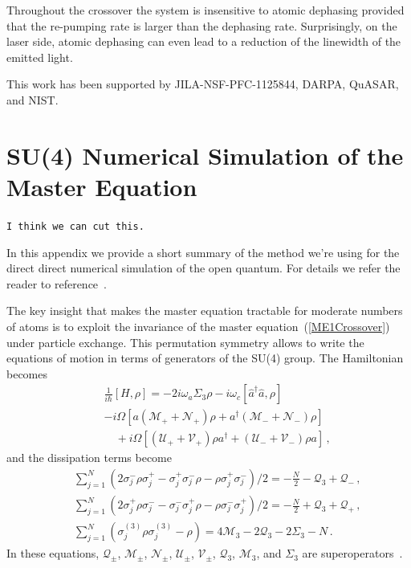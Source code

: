 \documentclass[aps,
twocolumn,
showpacs,
superscriptaddress,groupedaddress]{revtex4}
\newcommand{\dmcomment}[1]{{\tt #1}}
\begin{document}
Throughout the crossover the system is insensitive to atomic dephasing
provided that the re-pumping rate is larger than the dephasing rate.
Surprisingly, on the laser side, atomic dephasing can even lead to a
reduction of the linewidth of the emitted light.

This work has been supported by JILA-NSF-PFC-1125844, DARPA, QuASAR, and
NIST.

\appendix

\section{SU(4) Numerical Simulation of the Master Equation}
\label{Su4Appendix}

\dmcomment{I think we can cut this.}

In this appendix we provide a short summary of the method we're using
for the direct direct numerical simulation of the open quantum.  
For details we refer the reader to reference~\cite{PhysRevA.87.062101}.

The key insight that makes the master equation tractable for moderate
numbers of atoms is to exploit the invariance of the
master equation~(\ref{ME1Crossover}) under particle exchange.  This
permutation symmetry allows to write the equations of motion in terms of
generators of the SU(4) group.  The Hamiltonian becomes
\begin{eqnarray}
  &&\frac{1}{i\hbar}[H,\rho]=
  -2i \omega_a \Sigma_3\rho -i\omega_c [ \hat{a}^{\dagger}\hat{a}, \rho]
  \nonumber
  \\
  &&-i\Omega \left[a(\mathcal{M}_++\mathcal{N}_+)\rho+a^\dagger
    (\mathcal{M}_-+\mathcal{N}_-)\rho\right]\nonumber\\
  &&\quad{}+i\Omega\left[(\mathcal{U}_++\mathcal{V}_+)\rho a^\dagger
    +(\mathcal{U}_-+\mathcal{V}_-)\rho a\right]\,,
\end{eqnarray}
and the dissipation terms become
\begin{eqnarray}\label{liv}
 && \sum_{j=1}^N(
   2\sigma_j^-\rho\sigma_j^+-\sigma_j^+ \sigma_j^-\rho-
   \rho \sigma_j^+\sigma_j^-
  )/2=-\frac{N}{2}-
  \mathcal{Q}_3+\mathcal{Q}_{-}\,,\nonumber\\
 && \sum_{j=1}^N(
   2\sigma_j^+\rho\sigma_j^--\sigma_j^- \sigma_j^+\rho-
   \rho \sigma_j^-\sigma_j^+
  )/2=-\frac{N}{2}+
  \mathcal{Q}_3+\mathcal{Q}_{+}\,,\nonumber\\
 && \sum_{j=1}^N(\sigma_j^{(3)}\rho\sigma_j^{(3)}-\rho)=4\mathcal{M}_3-2
  \mathcal{Q}_3-2\Sigma_3-N\,.
  \label{ham}
\end{eqnarray}
In these equations, $\mathcal{Q}_{\pm}$, $\mathcal{M}_{\pm}$, $\mathcal{N}_{\pm}$,
$\mathcal{U}_{\pm}$, $\mathcal{V}_{\pm}$, $\mathcal{Q}_3$, $\mathcal{M}_3$,
and $\Sigma_3$ are superoperators~\cite{PhysRevA.87.062101}.
\end{document}
